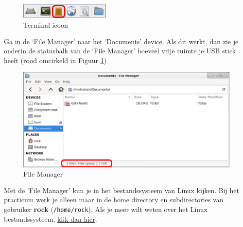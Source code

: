 \begin{figure}[h!]
	\centering
	\begin{center} 	
		\includegraphics[width=0.4\textwidth]{figuren/File-Manager}
		\caption{Terminal icoon}
		\label{fig:fileman}   
	\end{center}
\end{figure}
Ga in de ‘File Manager’ naar het ‘Documents’ device.\newline
Als dit werkt, dan zie je onderin de statusbalk van de ‘File Manager’ hoeveel vrije ruimte je USB stick heeft (rood omcirkeld in Figuur \ref{fig:fileman})

\begin{figure}[h!]
	\centering
	\begin{center} 	
		\includegraphics[width=1\textwidth]{figuren/FileManagerUsbStick}
		\caption{File Manager}
		\label{fig:FileManagerUsbStick}   
	\end{center}
\end{figure}

Met de 'File Manager' kun je in het bestandssysteem van Linux kijken.\newline
Bij het practicum werk je alleen maar in de home directory en subdirectories van gebruiker \textbf{rock} (\texttt{/home/rock}).\newline
Als je meer wilt weten over het Linux bestandssysteem, \href{https://www.techrepublic.com/article/linux-101-demystifying-the-linux-directory-structure/}{klik dan hier}.
